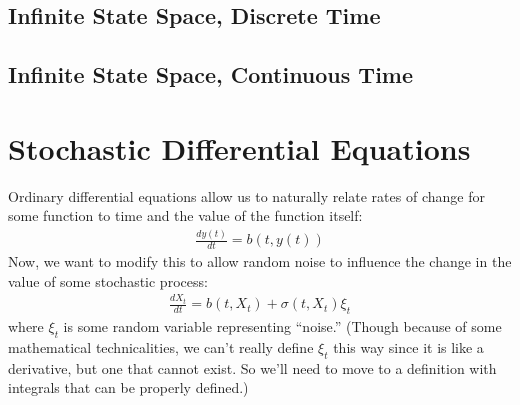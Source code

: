 \documentclass[12pt]{article}
\theoremstyle{plain}
\theoremstyle{definition}
\theoremstyle{remark}
\begin{document}
\subsection{Infinite State Space, Discrete Time}
\subsection{Infinite State Space, Continuous Time}

\section{Stochastic Differential Equations}

Ordinary differential equations allow us to naturally relate rates of
change for some function to time and the value of the function itself:
\begin{align*}
  \frac{dy(t)}{dt} = b(t,y(t))
\end{align*}
Now, we want to modify this to allow random noise to influence the
change in the value of some stochastic process:
\begin{align*}
  \frac{dX_t}{dt} = b(t,X_t) + \sigma(t,X_t) \xi_t
\end{align*}
where $\xi_t$ is some random variable representing ``noise.'' (Though
because of some mathematical technicalities, we can't really define
$\xi_t$ this way since it is like a derivative, but one that cannot
exist. So we'll need to move to a definition with integrals that can be
properly defined.)



\clearpage
\end{document}
